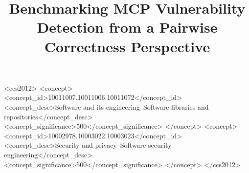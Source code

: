 \documentclass[sigconf,screen,review,anonymous]{acmart}
\theoremstyle{acmdefinition}
\begin{document}
\title{Benchmarking MCP Vulnerability Detection from a Pairwise Correctness Perspective}



\renewcommand{\shortauthors}{Trovato et al.}



\begin{CCSXML}
<ccs2012>
   <concept>
       <concept_id>10011007.10011006.10011072</concept_id>
       <concept_desc>Software and its engineering~Software libraries and repositories</concept_desc>
       <concept_significance>500</concept_significance>
       </concept>
   <concept>
       <concept_id>10002978.10003022.10003023</concept_id>
       <concept_desc>Security and privacy~Software security engineering</concept_desc>
       <concept_significance>500</concept_significance>
       </concept>
 </ccs2012>
\end{CCSXML}




\maketitle


 
    
    
    
    



\end{document}
